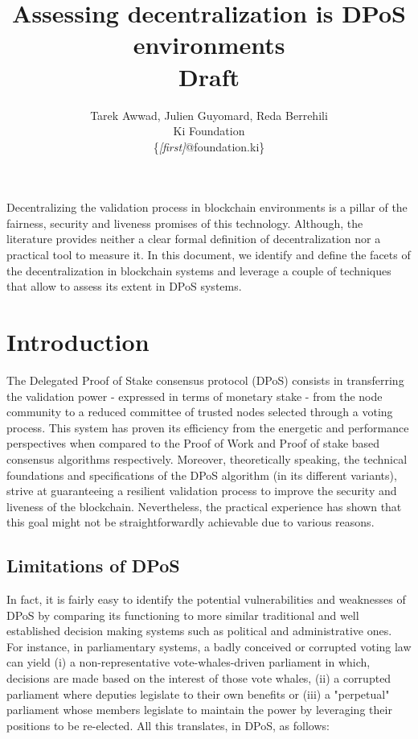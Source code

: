 \documentclass{article}
\begin{document}
\title{Assessing decentralization is DPoS environments\\ \small{Draft}}
\author{\normalsize Tarek Awwad, Julien Guyomard, Reda Berrehili\\Ki Foundation\\\small\{\textit{[first]}@foundation.ki\}}
\maketitle

\begin{abstract}
\end{abstract}
Decentralizing the validation process in blockchain environments is a pillar of the fairness, security and liveness promises of this technology. Although, the literature provides neither a clear formal definition of decentralization nor a practical tool to measure it. In this document, we identify and define the facets of the decentralization in blockchain systems and leverage a couple of techniques that allow to assess its extent in DPoS systems.

\section{Introduction}
\label{sec:intro}
The Delegated Proof of Stake consensus protocol (DPoS) consists in transferring the validation power - expressed in terms of monetary stake - from the node community to a reduced committee of trusted nodes selected through a voting process. This system has proven its efficiency from the energetic and performance perspectives when compared to the Proof of Work and Proof of stake based consensus algorithms respectively. Moreover, theoretically speaking, the technical foundations and specifications of the DPoS algorithm (in its different variants), strive at guaranteeing a resilient validation process to improve the security and liveness of the blockchain. Nevertheless, the practical experience has shown that this goal might not be straightforwardly achievable due to various reasons. 

\subsection{Limitations of DPoS}
In fact, it is fairly easy to identify the potential vulnerabilities and weaknesses of DPoS by comparing its functioning to more similar traditional and well established decision making systems such as political and administrative ones. For instance, in parliamentary systems, a badly conceived or corrupted voting law can yield (i) a non-representative vote-whales-driven parliament in which, decisions are made based on the interest of those vote whales, (ii) a corrupted parliament where deputies legislate to their own benefits or (iii) a "perpetual" parliament whose members legislate to maintain the power by leveraging their positions to be re-elected. All this translates, in DPoS, as follows:
\end{document}
